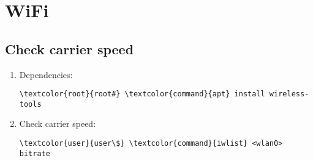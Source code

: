 \documentclass[10pt, a4paper, onecolumn, openany]{book} %
\begin{document}
\section{WiFi}
\subsection{Check carrier speed}
\begin{enumerate}
    \item Dependencies:
\begin{Verbatim}[commandchars=\\\{\}]
\textcolor{root}{root#} \textcolor{command}{apt} install wireless-tools
\end{Verbatim}
    \item Check carrier speed:
\begin{Verbatim}[commandchars=\\\{\}]
\textcolor{user}{user\$} \textcolor{command}{iwlist} <wlan0> bitrate
\end{Verbatim}
\end{enumerate}
\end{document}
